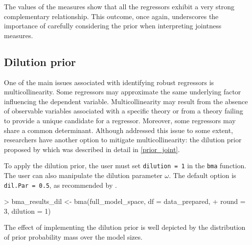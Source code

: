 \documentclass[a4paper]{article}
\begin{document}
\noindent The values of the measures show that all the regressors exhibit a very strong complementary relationship.
This outcome, once again, underscores the importance of carefully considering the prior when interpreting jointness measures.

\subsection{Dilution prior}\label{dil}
One of the main issues associated with identifying robust regressors is multicollinearity.
Some regressors may approximate the same underlying factor influencing the dependent variable.
Multicollinearity may result from the absence of observable variables associated with a specific theory or from a theory failing to provide a unique candidate for a regressor.
Moreover, some regressors may share a common determinant.
Although \citet{Moral+2013, Moral+2016} addressed this issue to some extent, researchers have another option to mitigate multicollinearity: the dilution prior proposed by \citet{George+2010} which was described in detail in \autoref{prior_joint}.

To apply the dilution prior, the user must set \verb+dilution = 1+ in the \verb+bma+ function.
The user can also manipulate the dilution parameter $\omega$.
The default option is \verb+dil.Par = 0.5+, as recommended by \citet{George+2010}.
\begin{Schunk}
\begin{Sinput}
> bma_results_dil <- bma(full_model_space, df = data_prepared,
+                        round = 3, dilution = 1)
\end{Sinput}
\end{Schunk}

\noindent The effect of implementing the dilution prior is well depicted by the distribution of prior probability mass over the model sizes.
\end{document}
